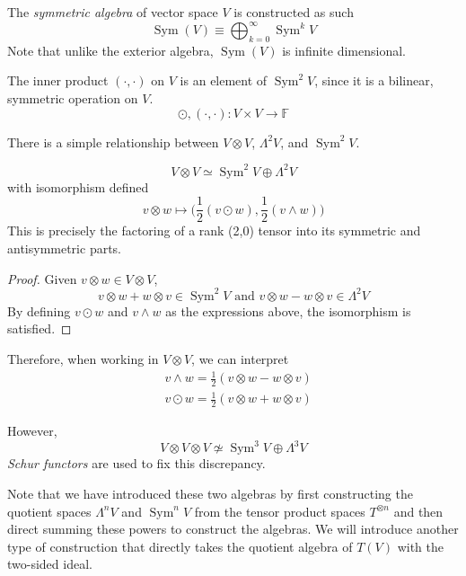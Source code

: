 \documentclass{article}
\DeclareMathOperator{\Sym}{Sym}
\begin{document}
    \begin{definition}
    The \textit{symmetric algebra} of vector space $V$ is constructed as such 
    \[\Sym (V) \equiv \bigoplus_{k=0}^\infty \Sym^k V\]
    Note that unlike the exterior algebra, $\Sym(V)$ is infinite dimensional. 
    \end{definition}

    \begin{example}
    The inner product $(\cdot, \cdot)$ on $V$ is an element of $\Sym^2 V$, since it is a bilinear, symmetric operation on $V$. 
    \[\odot, (\cdot, \cdot): V \times V \longrightarrow \mathbb{F}\]
    \end{example}

    There is a simple relationship between $V \otimes V$, $\Lambda^2 V$, and $\Sym^2 V$. 

    \begin{theorem}
    \[V \otimes V \simeq \Sym^2 V \oplus \Lambda^2 V\]
    with isomorphism defined
    \[v \otimes w \mapsto \Big( \frac{1}{2} (v \odot w), \frac{1}{2} (v \wedge w) \Big)\]
    This is precisely the factoring of a rank (2,0) tensor into its symmetric and antisymmetric parts. 
    \end{theorem}
    \begin{proof}
    Given $v \otimes w \in V \otimes V$, 
    \[v \otimes w + w \otimes v \in \Sym^2 V \text{ and } v \otimes w - w \otimes v \in \Lambda^2 V\]
    By defining $v \odot w$ and $v \wedge w$ as the expressions above, the isomorphism is satisfied. 
    \end{proof}

    Therefore, when working in $V \otimes V$, we can interpret 
    \begin{align*}
        & v \wedge w = \frac{1}{2} (v \otimes w - w \otimes v) \\
        & v \odot w = \frac{1}{2} (v \otimes w + w \otimes v) 
    \end{align*}

    However, 
    \[V \otimes V \otimes V \not\simeq \Sym^3 V \oplus \Lambda^3 V\]
    \textit{Schur functors} are used to fix this discrepancy. 

    Note that we have introduced these two algebras by first constructing the quotient spaces $\Lambda^n V$ and $\Sym ^n V$ from the tensor product spaces $T^{\otimes n}$ and then direct summing these powers to construct the algebras. We will introduce another type of construction that directly takes the quotient algebra of $T(V)$ with the two-sided ideal. 
\end{document}
